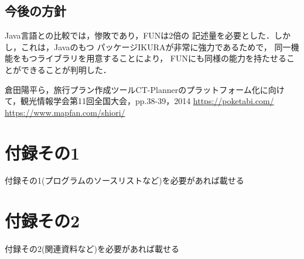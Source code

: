 \documentclass{funthesis}
\begin{document}
\section{今後の方針}

Java言語との比較では，惨敗であり，FUNは2倍の
記述量を必要とした．しかし，これは，Javaのもつ
パッケージIKURAが非常に強力であるためで，
同一機能をもつライブラリを用意することにより，
FUNにも同様の能力を持たせることができることが判明した．





\begin{thebibliography}{9}
  倉田陽平ら，旅行プラン作成ツールCT-Plannerのプラットフォーム化に向けて，観光情報学会第11回全国大会，pp.38-39，2014
  {\url{https://poketabi.com/}}
  {\url{https://www.mapfan.com/shiori/}}
\end{thebibliography}


\appendix

\chapter*{付録その1} %

付録その1(プログラムのソースリストなど)を必要があれば載せる

\chapter*{付録その2}

付録その2(関連資料など)を必要があれば載せる

\listoffigures

\listoftables
\end{document}
